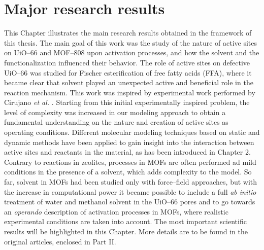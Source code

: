 \graphicspath{{figures/chapter3/}}
\renewcommand\evenpagerightmark{{\scshape\small Major research results}}
\renewcommand\oddpageleftmark{{\scshape\small Chapter 3}}

\hyphenation{}
\chapter[Major research results]%
{Major research results}
\label{ch3}
This Chapter illustrates the main research results obtained in the framework of this thesis. The main goal of this work was the study of the nature of active sites on UiO--66 and MOF--808 upon activation processes, and how the solvent and the functionalization influenced their behavior. The role of active sites on defective UiO--66 was studied for Fischer esterification of free fatty acids (FFA), where it became clear that solvent played an unexpected active and beneficial role in the reaction mechanism. This work was inspired by experimental work performed by Cirujano \textit{et al.} \cite{cirujano2015conversion, cirujano2015zirconium}. Starting from this initial experimentally inspired problem, the level of complexity was increased in our modeling approach to obtain a fundamental understanding on the nature and creation of active sites as operating conditions. Different molecular modeling techniques based on static and dynamic methods have been applied to gain insight into the interaction between active sites and reactants in the material, as has been introduced in Chapter 2. Contrary to reactions in zeolites, processes in MOFs are often performed ad mild conditions in the presence of a solvent, which adds complexity to the model. So far, solvent in MOFs had been studied only with force--field approaches, but with the increase in computational power it became possible to include a full \textit{ab initio} treatment of water and methanol solvent in the UiO--66 pores and to go towards an \textit{operando} description of activation processes in MOFs, where realistic experimental conditions are taken into account. The most important scientific results will be highlighted in this Chapter. More details are to be found in the original articles, enclosed in Part II.

